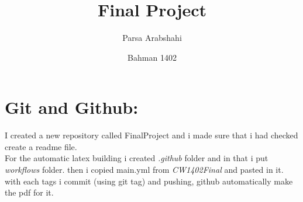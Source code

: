 \documentclass{article}
\title{
    \vspace{2in}
    \textbf{Final Project}\\
    \vspace{2in}
}
\author{Parsa Arabshahi }
\date{Bahman 1402}
\begin{document}
\begin{titlepage}
\maketitle
\end{titlepage}
\newpage
{}
\tableofcontents
\newpage
\section{Git and Github:}
I created a new repository called FinalProject and i made sure that i had checked create a readme file.\\
For the automatic latex building i created \textit{.github} folder and in that i put \textit{workflows} folder. then i copied main.yml from \textit{CW1402Final} and pasted in it.\\
with each tags i commit (using git tag) and pushing, github automatically make the pdf for it.
\end{document}
